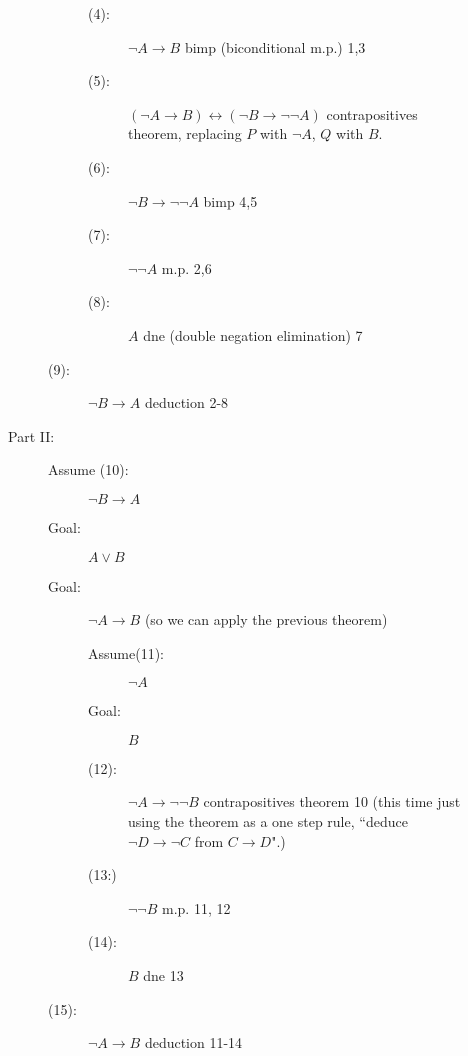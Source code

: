 \documentclass[12pt]{book}
\begin{document}
\begin{description}
\begin{description}
\begin{description}
\begin{description}
\item[(4):]  $\neg A \rightarrow B$  bimp (biconditional m.p.) 1,3

\item[(5):]  $(\neg A \rightarrow B) \leftrightarrow (\neg B \rightarrow \neg\neg A)$ contrapositives theorem, replacing $P$ with $\neg A$, $Q$ with $B$.

\item[(6):]  $\neg B \rightarrow \neg\neg A$  bimp 4,5

\item[(7):]  $\neg\neg A$ m.p. 2,6

\item[(8):] $A$ dne (double negation elimination) 7

\end{description}

\item[(9):]  $\neg B \rightarrow A$ deduction 2-8

\end{description}


\item[Part II:]

\begin{description}

\item[Assume (10):]  $\neg B \rightarrow A$

\item[Goal:]  $A \vee B$

\item[Goal:]  $\neg A \rightarrow B$ (so we can apply the previous theorem)

\begin{description}

\item[Assume(11):]  $\neg A$

\item[Goal:]  $B$

\item [(12):]  $\neg A \rightarrow \neg\neg B$ contrapositives theorem  10 (this time just using the theorem as a one step rule, ``deduce $\neg D \rightarrow \neg C$ from $C \rightarrow D$".)

\item [(13:)] $\neg\neg B$ m.p. 11, 12

\item[(14):]  $B$ dne 13

\end{description}

\item[(15):]  $\neg A \rightarrow B$ deduction 11-14


\end{description}
\end{description}
\end{description}
\end{document}
